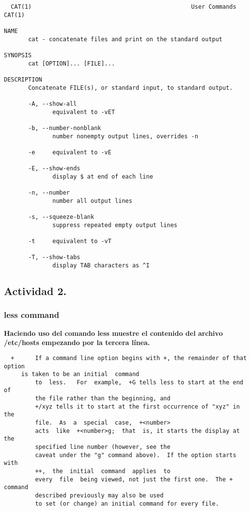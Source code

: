 \documentclass[a4paper,11pt,spanish]{article} %
\newenvironment{myscriptlisting}
{\begin{list}{}{\setlength{\leftmargin}{1em}}\item\scriptsize\bfseries}
{\end{list}}
\begin{document}
\begin{myscriptlisting}
 \begin{verbatim}
  CAT(1)                                              User Commands                                              CAT(1)

NAME
       cat - concatenate files and print on the standard output

SYNOPSIS
       cat [OPTION]... [FILE]...

DESCRIPTION
       Concatenate FILE(s), or standard input, to standard output.

       -A, --show-all
              equivalent to -vET

       -b, --number-nonblank
              number nonempty output lines, overrides -n

       -e     equivalent to -vE

       -E, --show-ends
              display $ at end of each line

       -n, --number
              number all output lines

       -s, --squeeze-blank
              suppress repeated empty output lines

       -t     equivalent to -vT

       -T, --show-tabs
              display TAB characters as ^I
 \end{verbatim}
\end{myscriptlisting}


\subsection{Actividad 2.}

\subsubsection{less command}

\textbf{Haciendo uso del comando less muestre el contenido del archivo /etc/hosts 
empezando por la tercera línea.}\\

\begin{myscriptlisting}
 \begin{verbatim}
  +      If a command line option begins with +, the remainder of that option 
	 is taken to be an initial  command
         to  less.   For  example,  +G tells less to start at the end of 
         the file rather than the beginning, and
         +/xyz tells it to start at the first occurrence of "xyz" in the
         file.  As  a  special  case,  +<number>
         acts  like  +<number>g;  that  is, it starts the display at the
         specified line number (however, see the
         caveat under the "g" command above).  If the option starts with 
         ++,  the  initial  command  applies  to
         every  file  being viewed, not just the first one.  The + command
         described previously may also be used
         to set (or change) an initial command for every file.
 \end{verbatim}
\end{myscriptlisting}
\end{document}
